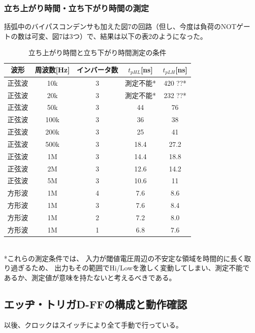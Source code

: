 \documentclass[10pt,a4j,dvipdfmx]{jsarticle}
\makeatletter
\let\@oldsubsec\subsection
\renewcommand{\subsection}[1]{\vspace{-7pt}\@oldsubsec{#1}}
\makeatother
\begin{document}
\subsubsection{立ち上がり時間・立ち下がり時間の測定}
括弧中のバイパスコンデンサも加えた図7の回路（但し、今度は負荷のNOTゲートの数は可変、図7は3つ）で、結果は以下の表2のようになった。

\begin{table}[H]
    \centering
    \caption{立ち上がり時間と立ち下がり時間測定の条件}
    \begin{tabular}{|c|c|c||c|c|} \hline
      波形 & 周波数[\si{\hertz}] & インバータ数 & $t_{pHL}$[\si{\nano\second}] & $t_{pLH}$[\si{\nano\second}] \\ \hline \hline
      正弦波 & 10k & 3 & 測定不能* & 420 ??*\\
      正弦波 & 20k & 3 & 測定不能* & 232 ??*\\
      正弦波 & 50k & 3 & 44 & 76 \\
      正弦波 & 100k & 3 & 36 & 38 \\
      正弦波 & 200k & 3 & 25 & 41\\
      正弦波 & 500k & 3 & 18.4 & 27.2 \\
      正弦波 & 1M & 3 & 14.4 & 18.8 \\
      正弦波 & 2M & 3 & 12.6 & 14.2\\
      正弦波 & 5M & 3 & 10.6 & 11 \\
      方形波 & 1M & 4 & 7.6 & 8.6 \\             
      方形波 & 1M & 3 & 7.6 & 8.4 \\
      方形波 & 1M & 2 & 7.2 & 8.0 \\
      方形波 & 1M & 1 & 6.8 & 7.6 \\
      \hline
    \end{tabular}\\
      *これらの測定条件では、
      入力が閾値電圧周辺の不安定な領域を時間的に長く取り過ぎるため、
      出力もその範囲でHi/Lowを激しく変動してしまい、測定不能であるか、測定値が意味を持たないと考えるべきである。
\end{table}

\subsection{エッヂ・トリガD-FFの構成と動作確認}
以後、クロックはスイッチにより全て手動で行っている。
\end{document}
